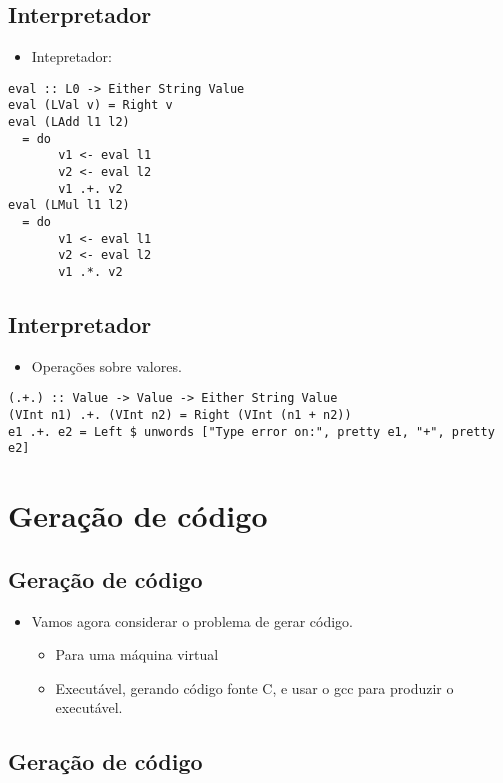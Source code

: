 \documentclass[11pt]{article}
\begin{document}
\subsection*{Interpretador}
\label{sec:org7bc21e2}

\begin{itemize}
\item Intepretador:
\end{itemize}

\begin{verbatim}
eval :: L0 -> Either String Value 
eval (LVal v) = Right v 
eval (LAdd l1 l2) 
  = do 
       v1 <- eval l1 
       v2 <- eval l2 
       v1 .+. v2 
eval (LMul l1 l2) 
  = do 
       v1 <- eval l1
       v2 <- eval l2 
       v1 .*. v2
\end{verbatim}
\subsection*{Interpretador}
\label{sec:org9a0cae1}

\begin{itemize}
\item Operações sobre valores.
\end{itemize}

\begin{verbatim}
(.+.) :: Value -> Value -> Either String Value 
(VInt n1) .+. (VInt n2) = Right (VInt (n1 + n2))
e1 .+. e2 = Left $ unwords ["Type error on:", pretty e1, "+", pretty e2] 
\end{verbatim}
\section*{Geração de código}
\label{sec:org3764367}

\subsection*{Geração de código}
\label{sec:org15ab5cd}

\begin{itemize}
\item Vamos agora considerar o problema de gerar código. 
\begin{itemize}
\item Para uma máquina virtual
\item Executável, gerando código fonte C, e usar o gcc para produzir o executável.
\end{itemize}
\end{itemize}
\subsection*{Geração de código}
\label{sec:orgfae5f2c}
\end{document}
